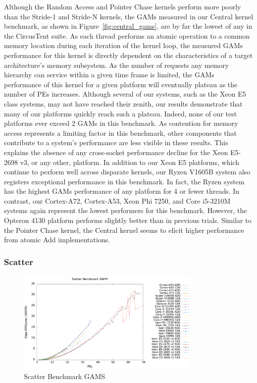 Although the Random Access and Pointer Chase kernels perform more poorly than the Stride-1 and Stride-N kernels, the GAMs measured in our Central kernel benchmark, as shown in Figure~\ref{fig:central_gams}, are by far the lowest of any in the CircusTent suite.
As each thread performs an atomic operation to a common memory location during each iteration of the kernel loop, the measured GAMs performance for this kernel is directly dependent on the characteristics of a target architecture's memory subsystem.
As the number of requests any memory hierarchy can service within a given time frame is limited, the GAMs performance of this kernel for a given platform will eventually plateau as the number of PEs increases.
Although several of our systems, such as the Xeon E5 class systems, may not have reached their zenith, our results demonstrate that many of our platforms quickly reach such a plateau.
Indeed, none of our test platforms ever exceed 2 GAMs in this benchmark.
As contention for memory access represents a limiting factor in this benchmark, other components that contribute to a system's performance are less visible in these results.
This explains the absence of any cross-socket performance decline for the Xeon E5-2698 v3, or any other, platform.
In addition to our Xeon E5 platforms, which continue to perform well across disparate kernels, our Ryzen V1605B system also registers exceptional performance in this benchmark.
In fact, the Ryzen system has the highest GAMs performance of any platform for 4 or fewer threads.
In contrast, our Cortex-A72, Cortex-A53, Xeon Phi 7250, and Core i5-3210M systems again represent the lowest performers for this benchmark.
However, the Opteron 4130 platform performs slightly better than in previous trials.
Similar to the Pointer Chase kernel, the Central kernel seems to elicit higher performance from atomic Add implementations.

\subsubsection{Scatter}
\label{subsubsec:scatter_res}

\begin{figure}[!t]
\centering
\includegraphics[width=3.5in]{figures/SCATTER_GAMS.png}
\caption{Scatter Benchmark GAMS}
\label{fig:scatter_gams}
\end{figure}

